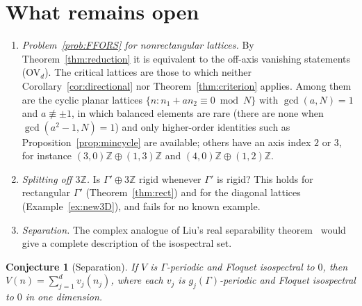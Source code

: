 \documentclass[11pt,reqno]{amsart}
\newtheorem{conjecture}[theorem]{Conjecture}
\theoremstyle{definition}
\theoremstyle{remark}
\newcommand{\Z}{\mathbb Z}
\begin{document}
\section{What remains open}\label{sec:open}

\begin{enumerate}[label=(\arabic*)]
\item \emph{Problem~\ref{prob:FFORS} for nonrectangular lattices.}  By
Theorem~\ref{thm:reduction} it is equivalent to the off-axis vanishing
statements (OV$_d$).  The critical lattices are those to which neither
Corollary~\ref{cor:directional} nor Theorem~\ref{thm:criterion} applies.  Among
them are the cyclic planar lattices $\{n:n_1+an_2\equiv0\bmod N\}$ with
$\gcd(a,N)=1$ and $a\not\equiv\pm1$, in which balanced elements are rare (there
are none when $\gcd(a^2-1,N)=1$) and only higher-order identities such as
Proposition~\ref{prop:mincycle} are available; others have an axis index $2$
or $3$, for instance $(3,0)\Z\oplus(1,3)\Z$ and $(4,0)\Z\oplus(1,2)\Z$.
\item \emph{Splitting off $3\Z$.}  Is $\Gamma'\oplus3\Z$ rigid whenever
$\Gamma'$ is rigid?  This holds for rectangular $\Gamma'$ (Theorem~\ref{thm:rect})
and for the diagonal lattices (Example~\ref{ex:new3D}), and fails for no known
example.
\item \emph{Separation.}  The complex analogue of Liu's real separability
theorem~\cite{Liu2023JDE} would give a complete description of the isospectral set.
\end{enumerate}

\begin{conjecture}[Separation]\label{conj:separation}
If $V$ is $\Gamma$-periodic and Floquet isospectral to $0$, then
$V(n)=\sum_{j=1}^dv_j(n_j)$, where each $v_j$ is $g_j(\Gamma)$-periodic and
Floquet isospectral to $0$ in one dimension.
\end{conjecture}
\end{document}
